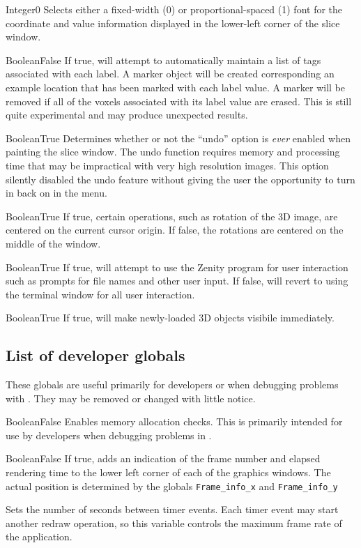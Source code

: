 {Integer}{0}
{Selects either a fixed-width (0) or proportional-spaced (1) font for the
coordinate and value information displayed in the lower-left corner of the slice window.}{}

{Boolean}{False}
{If true, \display{} will attempt to automatically maintain a list of
 tags associated with each label. A marker object will be created
 corresponding an example location that has been marked with each label
 value. A marker will be removed if all of the voxels associated
 with its label value are erased.
 This is still quite experimental and may produce unexpected results.}{}

{Boolean}{True}
{Determines whether or not the ``undo'' option is {\em ever} enabled when painting the slice window. The undo function requires memory and processing time that may be impractical with very high resolution images. This option silently disabled the undo feature without giving the user the opportunity to turn in back on in the menu.}{}

{Boolean}{True}
{If true, certain operations, such as rotation of the 3D image, are centered on the current cursor origin. If false, the rotations are centered on the middle of the window.}{}

{Boolean}{True}
{If true, \display{} will attempt to use the Zenity program for user interaction
such as prompts for file names and other user input. If false, 
\display{} will revert to using the terminal window for all user interaction.}{}

{Boolean}{True}
{If true, \display{} will make newly-loaded 3D objects visibile immediately.}{}

\subsection{List of developer globals}
These globals are useful primarily for developers or when debugging problems
with \display. They may be removed or changed with little notice.

{Boolean}{False}
{Enables memory allocation checks. This is primarily intended for use by developers when debugging problems in \display.}{}

{Boolean}{False}
{If true, adds an indication of the frame number and elapsed rendering time to the lower left corner of each of the graphics windows. The actual position is determined by the globals {\tt Frame\_info\_x} and {\tt Frame\_info\_y}}{}

{Sets the number of seconds between timer events. Each timer event may
start another redraw operation, so this variable controls the maximum
frame rate of the application.}{}

